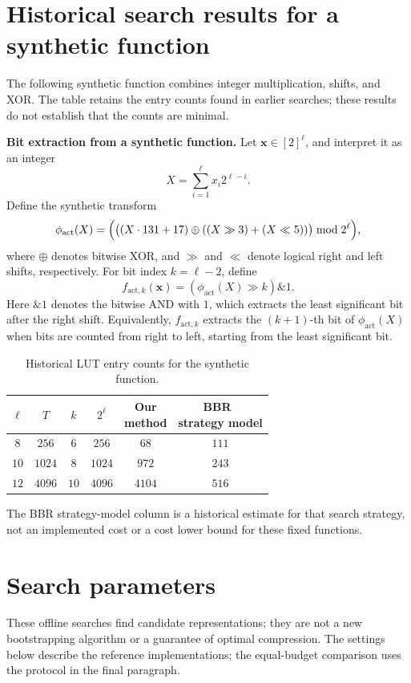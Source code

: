 \documentclass[11pt,a4paper]{article}
\begin{document}
\section{Historical search results for a synthetic function}\label{app:stress}
The following synthetic function combines integer multiplication, shifts, and XOR. The table retains the entry counts found in earlier searches; these results do not establish that the counts are minimal.

\noindent\textbf{Bit extraction from a synthetic function.}
Let $\mathbf{x}\in[2]^\ell$, and interpret it as an integer
\[
X=\sum_{i=1}^\ell x_i2^{\ell-i}.
\]
Define the synthetic transform
\[
\phi_{\mathrm{act}}(X)
=
\Bigl(
\bigl((X\cdot 131+17)\oplus((X\gg 3)+(X\ll 5))\bigr)
\bmod 2^\ell
\Bigr),
\]
where $\oplus$ denotes bitwise XOR, and $\gg$ and $\ll$ denote logical right and left shifts, respectively. For bit index $k=\ell-2$, define
\[
f_{\mathrm{act},k}(\mathbf{x})
=
(\phi_{\mathrm{act}}(X)\gg k)\mathbin{\&}1.
\]
Here $\mathbin{\&}1$ denotes the bitwise AND with $1$, which extracts the least significant bit after the right shift. Equivalently, $f_{\mathrm{act},k}$ extracts the $(k+1)$-th bit of $\phi_{\mathrm{act}}(X)$ when bits are counted from right to left, starting from the least significant bit.

\begin{table}[H]
	\centering
	\small
	\caption{Historical LUT entry counts for the synthetic function.}
	\label{tab:compress-activation-bit}
	\begin{tabular}{c|c|c|c|c|c}
		\hline
		$\ell$ & $T$ & $k$ & $2^\ell$
		& \makecell{Our\\method}
		& \makecell{BBR~\cite{BBR26}\\strategy model} \\
		\hline
		$8$  & $256$  & $6$  & $256$  & $68$   & $111$ \\
		$10$ & $1024$ & $8$  & $1024$ & $972$  & $243$ \\
		$12$ & $4096$ & $10$ & $4096$ & $4104$ & $516$ \\
		\hline
	\end{tabular}
\end{table}




The BBR strategy-model column is a historical estimate for that search strategy, not an implemented cost or a cost lower bound for these fixed functions.


\section{Search parameters}
\label{app:search-parameters}
These offline searches find candidate representations; they are not a new bootstrapping algorithm or a guarantee of optimal compression. The settings below describe the reference implementations; the equal-budget comparison uses the protocol in the final paragraph.
\end{document}
